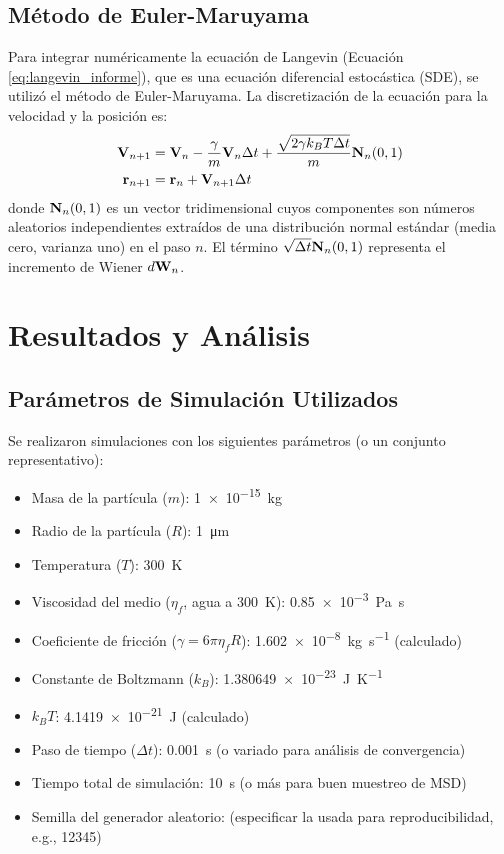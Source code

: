\documentclass[11pt,a4paper]{article}
\begin{document}
\subsection{Método de Euler-Maruyama}
Para integrar numéricamente la ecuación de Langevin (Ecuación \ref{eq:langevin_informe}), que es una ecuación diferencial estocástica (SDE), se utilizó el método de Euler-Maruyama. La discretización de la ecuación para la velocidad y la posición es:
\begin{align}
    \vb{V}_{n+1} &= \vb{V}_n - \frac{\gamma}{m}\vb{V}_n \Delta t + \frac{\sqrt{2\gamma k_B T \Delta t}}{m} \vb{N}_n(0,1) \\
    \vb{r}_{n+1} &= \vb{r}_n + \vb{V}_{n+1} \Delta t
\end{align}
donde $\vb{N}_n(0,1)$ es un vector tridimensional cuyos componentes son números aleatorios independientes extraídos de una distribución normal estándar (media cero, varianza uno) en el paso $n$. El término $\sqrt{\Delta t} \vb{N}_n(0,1)$ representa el incremento de Wiener $d\vb{W}_n$.

\section{Resultados y Análisis}
\subsection{Parámetros de Simulación Utilizados}
Se realizaron simulaciones con los siguientes parámetros (o un conjunto representativo):
\begin{itemize}
    \item Masa de la partícula ($m$): \SI{1e-15}{\kilo\gram}
    \item Radio de la partícula ($R$): \SI{1}{\micro\meter}
    \item Temperatura ($T$): \SI{300}{\kelvin}
    \item Viscosidad del medio ($\eta_f$, agua a \SI{300}{\kelvin}): \SI{0.85e-3}{\pascal\second}
    \item Coeficiente de fricción ($\gamma = 6\pi\eta_f R$): \SI{1.602e-8}{\kilo\gram\per\second} (calculado)
    \item Constante de Boltzmann ($k_B$): \SI{1.380649e-23}{\joule\per\kelvin}
    \item $k_B T$: \SI{4.1419e-21}{\joule} (calculado)
    \item Paso de tiempo ($\Delta t$): \SI{0.001}{\second} (o variado para análisis de convergencia)
    \item Tiempo total de simulación: \SI{10}{\second} (o más para buen muestreo de MSD)
    \item Semilla del generador aleatorio: (especificar la usada para reproducibilidad, e.g., 12345)
\end{itemize}
\end{document}
